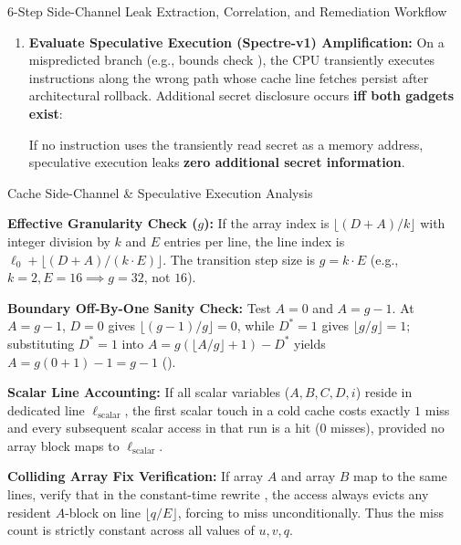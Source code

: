 \begin{schemebox}{6-Step Side-Channel Leak Extraction, Correlation, and Remediation Workflow}
\begin{enumerate}[label=\textbf{Step \arabic*:}, leftmargin=3.8em]
  \item \textbf{Evaluate Speculative Execution (Spectre-v1) Amplification:}
  On a mispredicted branch (e.g., bounds check ), the CPU transiently executes instructions along the wrong path whose cache line fetches persist after architectural rollback. Additional secret disclosure occurs \textbf{iff both gadgets exist}:
  If no instruction uses the transiently read secret as a memory address, speculative execution leaks \textbf{zero additional secret information}.
\end{enumerate}
\end{schemebox}

\begin{verifybox}{Cache Side-Channel \& Speculative Execution Analysis}
\begin{compactitem}
  \item \textbf{Effective Granularity Check ($g$):} If the array index is $\lfloor (D + A)/k \rfloor$ with integer division by $k$ and $E$ entries per line, the line index is $\ell_0 + \lfloor (D + A)/(k \cdot E) \rfloor$. The transition step size is $g = k \cdot E$ (e.g., $k=2, E=16 \implies g = 32$, not $16$).
  \item \textbf{Boundary Off-By-One Sanity Check:} Test $A = 0$ and $A = g - 1$. At $A = g - 1$, $D = 0$ gives $\lfloor (g-1)/g \rfloor = 0$, while $D^* = 1$ gives $\lfloor g/g \rfloor = 1$; substituting $D^* = 1$ into $A = g(\lfloor A/g \rfloor + 1) - D^*$ yields $A = g(0 + 1) - 1 = g - 1$ (\checkmark).
  \item \textbf{Scalar Line Accounting:} If all scalar variables ($A, B, C, D, i$) reside in dedicated line $\ell_{\text{scalar}}$, the first scalar touch in a cold cache costs exactly $1$ miss and every subsequent scalar access in that run is a hit ($0$ misses), provided no array block maps to $\ell_{\text{scalar}}$.
  \item \textbf{Colliding Array Fix Verification:} If array $A$ and array $B$ map to the same lines, verify that in the constant-time rewrite , the access  always evicts any resident $A$-block on line $\lfloor q/E \rfloor$, forcing  to miss unconditionally. Thus the miss count is strictly constant across all values of $u, v, q$.
\end{compactitem}
\end{verifybox}

